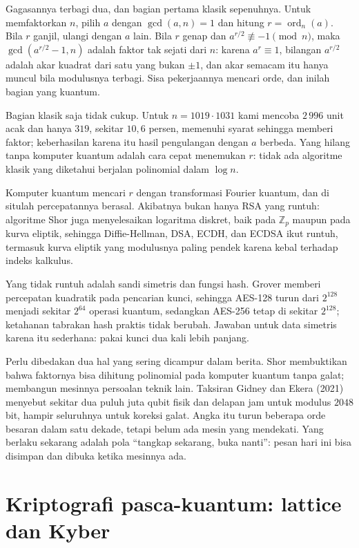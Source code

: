 Gagasannya terbagi dua, dan bagian pertama klasik sepenuhnya. Untuk memfaktorkan $n$, pilih $a$
dengan $\gcd(a,n)=1$ dan hitung $r=\operatorname{ord}_n(a)$. Bila $r$ ganjil, ulangi dengan $a$
lain. Bila $r$ genap dan $a^{r/2}\not\equiv-1\pmod n$, maka $\gcd(a^{r/2}-1,n)$ adalah faktor
tak sejati dari $n$: karena $a^r\equiv1$, bilangan $a^{r/2}$ adalah akar kuadrat dari satu
yang bukan $\pm1$, dan akar semacam itu hanya muncul bila modulusnya terbagi. Sisa pekerjaannya
mencari orde, dan inilah bagian yang kuantum.

Bagian klasik saja tidak cukup. Untuk $n=1019\cdot1031$ kami mencoba $2\,996$ unit acak dan
hanya $319$, sekitar $10{,}6$ persen, memenuhi syarat sehingga memberi faktor; keberhasilan
karena itu hasil pengulangan dengan $a$ berbeda. Yang hilang tanpa komputer kuantum adalah cara
cepat menemukan $r$: tidak ada algoritme klasik yang diketahui berjalan polinomial dalam
$\log n$.

Komputer kuantum mencari $r$ dengan transformasi Fourier kuantum, dan di situlah percepatannya
berasal. Akibatnya bukan hanya RSA yang runtuh: algoritme Shor juga menyelesaikan logaritma
diskret, baik pada $\mathbb{Z}_p$ maupun pada kurva eliptik, sehingga Diffie-Hellman, DSA, ECDH, dan ECDSA ikut runtuh, termasuk kurva eliptik yang modulusnya paling
pendek karena kebal terhadap indeks kalkulus.

Yang tidak runtuh adalah sandi simetris dan fungsi hash. Grover memberi percepatan kuadratik
pada pencarian kunci, sehingga AES-128 turun dari $2^{128}$ menjadi sekitar $2^{64}$ operasi
kuantum, sedangkan AES-256 tetap di sekitar $2^{128}$; ketahanan tabrakan hash praktis tidak
berubah. Jawaban untuk data simetris karena itu sederhana: pakai kunci dua kali lebih panjang.

Perlu dibedakan dua hal yang sering dicampur dalam berita. Shor membuktikan bahwa faktornya
bisa dihitung polinomial pada komputer kuantum tanpa galat; membangun mesinnya persoalan
teknik lain. Taksiran Gidney dan Ekera (2021) menyebut sekitar dua puluh juta qubit fisik dan
delapan jam untuk modulus $2048$ bit, hampir seluruhnya untuk koreksi galat. Angka itu turun
beberapa orde besaran dalam satu dekade, tetapi belum ada mesin yang mendekati. Yang berlaku
sekarang adalah pola ``tangkap sekarang, buka nanti'': pesan hari ini bisa disimpan dan dibuka
ketika mesinnya ada.

\section{Kriptografi pasca-kuantum: lattice dan Kyber}

